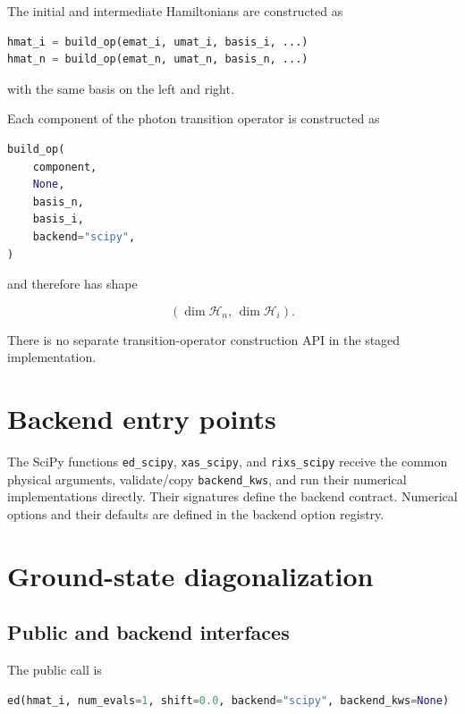 \documentclass[11pt]{article}
\begin{document}
The initial and intermediate Hamiltonians are constructed as

\begin{lstlisting}[language=Python]
hmat_i = build_op(emat_i, umat_i, basis_i, ...)
hmat_n = build_op(emat_n, umat_n, basis_n, ...)
\end{lstlisting}

with the same basis on the left and right.

Each component of the photon transition operator is constructed as

\begin{lstlisting}[language=Python]
build_op(
    component,
    None,
    basis_n,
    basis_i,
    backend="scipy",
)
\end{lstlisting}

and therefore has shape

\begin{equation}
  (\dim \mathcal H_n,\,\dim \mathcal H_i).
\end{equation}

There is no separate transition-operator construction API in the staged implementation.

\section{Backend entry points}

The SciPy functions \texttt{ed\_scipy}, \texttt{xas\_scipy}, and \texttt{rixs\_scipy} receive the common physical arguments, validate/copy \texttt{backend\_kws}, and run their numerical implementations directly. Their signatures define the backend contract. Numerical options and their defaults are defined in the backend option registry.

\section{Ground-state diagonalization}

\subsection{Public and backend interfaces}

The public call is

\begin{lstlisting}[language=Python]
ed(hmat_i, num_evals=1, shift=0.0, backend="scipy", backend_kws=None)
\end{lstlisting}
\end{document}
